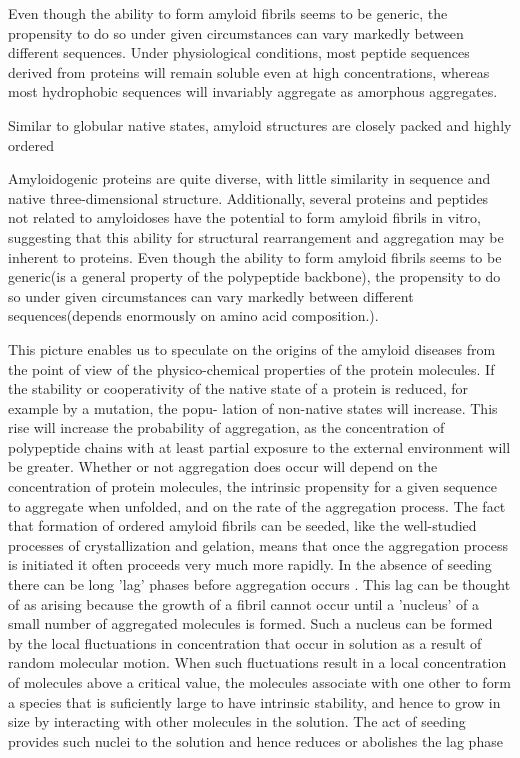 Even though the ability to form amyloid fibrils seems to be generic, the propensity to do so under given circumstances can vary markedly between different sequences.
Under physiological conditions, most peptide sequences derived from proteins will remain soluble even at high concentrations, whereas most hydrophobic sequences will invariably aggregate as amorphous aggregates.

Similar to globular native states, amyloid structures are closely packed and highly ordered



Amyloidogenic proteins are quite diverse, with little similarity in sequence and native three-dimensional structure.
Additionally, several proteins and peptides not related to amyloidoses have the potential to form amyloid fibrils in vitro, suggesting that this ability for structural rearrangement and aggregation may be inherent to proteins.
Even though the ability to form amyloid fibrils seems to be generic(is a general property of the polypeptide backbone), the propensity to do so under given circumstances can vary markedly between different sequences(depends enormously on amino acid composition.).

This picture enables us to speculate on the origins of
the amyloid diseases from the point of view of the
physico-chemical properties of the protein molecules. If
the stability or cooperativity of the native state of a
protein is reduced, for example by a mutation, the popu-
lation of non-native states will increase.
This rise will increase the probability of aggregation, as the
concentration of polypeptide chains with at least partial
exposure to the external environment will be greater.
Whether or not aggregation does occur will depend on
the concentration of protein molecules, the intrinsic
propensity for a given sequence to aggregate when
unfolded, and on the rate of the aggregation process. The
fact that formation of ordered amyloid fibrils can be
seeded, like the well-studied processes of crystallization
and gelation, means that once the aggregation process is
initiated it often proceeds very much more rapidly.
In the absence of seeding there can be
long 'lag' phases before aggregation occurs .
This lag can be thought of as arising because the growth
of a fibril cannot occur until a 'nucleus' of a small number
of aggregated molecules is formed. Such a nucleus can be
formed by the local fluctuations in concentration that
occur in solution as a result of random molecular motion.
When such fluctuations result in a local concentration of
molecules above a critical value, the molecules associate
with one other to form a species that is suficiently large
to have intrinsic stability, and hence to grow in size by
interacting with other molecules in the solution. The act
of seeding provides such nuclei to the solution and hence
reduces or abolishes the lag phase








